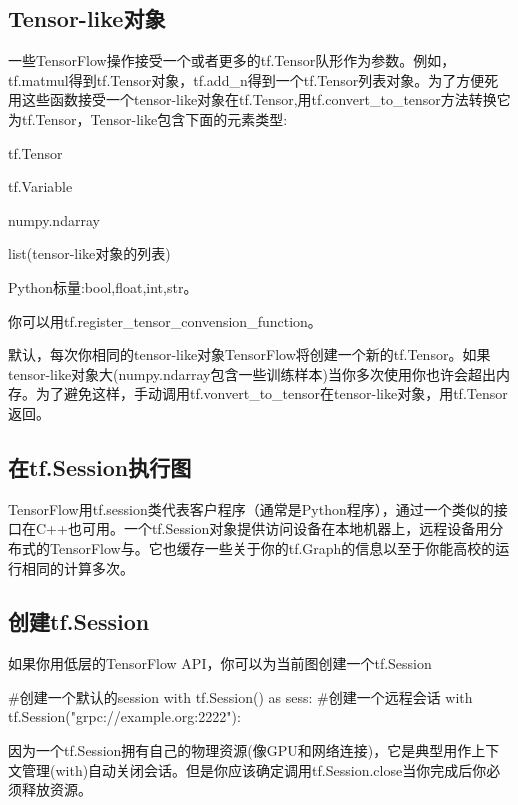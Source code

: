 \subsection{Tensor-like对象}
一些TensorFlow操作接受一个或者更多的tf.Tensor队形作为参数。例如，tf.matmul得到tf.Tensor对象，tf.add\_n得到一个tf.Tensor列表对象。为了方便死用这些函数接受一个tensor-like对象在tf.Tensor,用tf.convert\_to\_tensor方法转换它为tf.Tensor，Tensor-like包含下面的元素类型:
\begin{python}
\item tf.Tensor
\item tf.Variable
\item numpy.ndarray
\item list(tensor-like对象的列表)
\item Python标量:bool,float,int,str。
\end{python}
你可以用tf.register\_tensor\_convension\_function。

默认，每次你相同的tensor-like对象TensorFlow将创建一个新的tf.Tensor。如果tensor-like对象大(numpy.ndarray包含一些训练样本)当你多次使用你也许会超出内存。为了避免这样，手动调用tf.vonvert\_to\_tensor在tensor-like对象，用tf.Tensor返回。
\subsection{在tf.Session执行图}
TensorFlow用tf.session类代表客户程序（通常是Python程序），通过一个类似的接口在C++也可用。一个tf.Session对象提供访问设备在本地机器上，远程设备用分布式的TensorFlow与。它也缓存一些关于你的tf.Graph的信息以至于你能高校的运行相同的计算多次。
\subsection{创建tf.Session}
如果你用低层的TensorFlow API，你可以为当前图创建一个tf.Session
\begin{python}
#创建一个默认的session
with tf.Session() as sess:
#创建一个远程会话
with tf.Session("grpc://example.org:2222"):
\end{python}
因为一个tf.Session拥有自己的物理资源(像GPU和网络连接)，它是典型用作上下文管理(with)自动关闭会话。但是你应该确定调用tf.Session.close当你完成后你必须释放资源。

